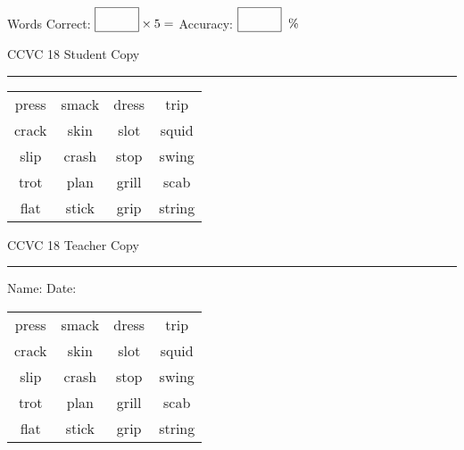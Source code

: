 \documentclass{memoir}
\begin{document}
\normalsize

Words Correct: $\fbox{\phantom{\huge 100}} \times 5 = $ Accuracy: $\fbox{\phantom{\huge 100}}\;\; \%$ 

\vfill

\newpage


\footnotesize \noindent
CCVC 18 \hfill Student Copy
\smallskip
\hrule

\Large

\setlength{\tabcolsep}{14pt}
\def\arraystretch{3}

{\selectfont


\begin{vplace}[0.5]
\begin{center}
\begin{tabular}{cccc}
press       & smack & dress & trip \\
crack       & skin & slot & squid \\
slip & crash & stop & swing \\
trot & plan & grill            & scab \\
flat             & stick & grip      & string \\
\end{tabular}
\end{center}
\end{vplace}

}

\newpage

\footnotesize \noindent
CCVC 18 \hfill Teacher Copy
\smallskip
\hrule

\normalsize

\vfill

\noindent
Name: \underline{\hspace{1.75in}} \hfill Date: \underline{\hspace{1in}}

\Large

{\selectfont


\begin{vplace}[0.5]
\begin{center}
\begin{tabular}{cccc}
press       & smack & dress & trip \\
crack       & skin & slot & squid \\
slip & crash & stop & swing \\
trot & plan & grill            & scab \\
flat             & stick & grip      & string \\
\end{tabular}
\end{center}
\end{vplace}



}
\end{document}
